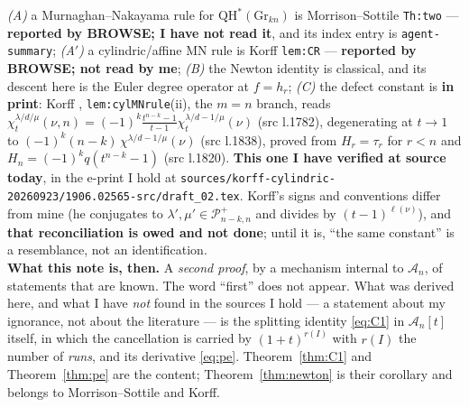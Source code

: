 \documentclass[11pt]{article}
\theoremstyle{plain}
\theoremstyle{definition}
\newcommand{\A}{\mathscr{A}}
\newcommand{\QH}{\mathrm{QH}^*}
\newcommand{\Gr}{\mathrm{Gr}}
\begin{document}
\begin{center}
{\begin{minipage}{0.92\textwidth}
\emph{(A)} a Murnaghan--Nakayama rule for $\QH(\Gr_{kn})$ is
Morrison--Sottile \cite{MS} \texttt{Th:two} --- \textbf{reported by BROWSE; I
have not read it}, and its index entry is \texttt{agent-summary};
\emph{(A$'$)} a cylindric/affine MN rule is Korff \cite{Korff18}
\texttt{lem:CR} --- \textbf{reported by BROWSE; not read by me};
\emph{(B)} the Newton identity is classical, and its descent here is the Euler
degree operator at $f=h_r$;
\emph{(C)} the defect constant is \textbf{in print}: Korff \cite{Korff19},
\texttt{lem:cylMNrule}(ii), the $m=n$ branch, reads
$\chi_t^{\lambda/d/\mu}(\nu,n)=(-1)^k\frac{t^{n-k}-1}{t-1}\chi_t^{\lambda/d-1/\mu}(\nu)$
(src l.1782), degenerating at $t\to1$ to $(-1)^k(n-k)\,\chi^{\lambda/d-1/\mu}(\nu)$
(src l.1838), proved from $H_r=\tau_r$ for $r<n$ and
$H_n=(-1)^kq(t^{n-k}-1)$ (src l.1820).  \textbf{This one I have verified at
source today}, in the e-print I hold at
\texttt{sources/korff-cylindric-20260923/1906.02565-src/draft\_02.tex}.
Korff's signs and conventions differ from mine (he conjugates to
$\lambda',\mu'\in\mathcal P^+_{n-k,n}$ and divides by $(t-1)^{\ell(\nu)}$), and
\textbf{that reconciliation is owed and not done}; until it is, ``the same
constant'' is a resemblance, not an identification.
\\[4pt]
\textbf{What this note is, then.}\quad
A \emph{second proof}, by a mechanism internal to $\A_n$, of statements that are
known.  The word ``first'' does not appear.  What was derived here, and what I
have \emph{not} found in the sources I hold --- a statement about my ignorance,
not about the literature --- is the splitting identity
\eqref{eq:C1} in $\A_n[t]$ itself, in which the cancellation is carried by
$(1+t)^{r(I)}$ with $r(I)$ the number of \emph{runs}, and its derivative
\eqref{eq:pe}.  Theorem~\ref{thm:C1} and Theorem~\ref{thm:pe} are the content;
Theorem~\ref{thm:newton} is their corollary and belongs to Morrison--Sottile and
Korff.
\end{minipage}}\end{center}

\bigskip
\end{document}
